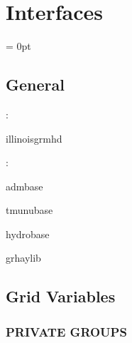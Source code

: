 
\section{Interfaces} 


\parskip = 0pt

\vspace{3mm} \subsection*{General}

: 

illinoisgrmhd
\vspace{2mm}

: 

admbase

tmunubase

hydrobase

grhaylib
\vspace{2mm}
\subsection*{Grid Variables}
\vspace{5mm}\subsubsection{PRIVATE GROUPS}

\vspace{5mm}

